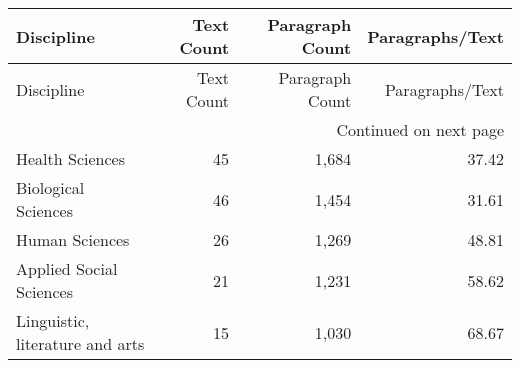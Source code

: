 \begin{longtable}{lrrr}
\toprule
Discipline & Text Count & Paragraph Count & Paragraphs/Text \\
\midrule
\endfirsthead
\toprule
Discipline & Text Count & Paragraph Count & Paragraphs/Text \\
\midrule
\endhead
\midrule
\multicolumn{4}{r}{Continued on next page} \\
\midrule
\endfoot
\bottomrule
\endlastfoot
Health Sciences & 45 & 1,684 & 37.42 \\
Biological Sciences & 46 & 1,454 & 31.61 \\
Human Sciences & 26 & 1,269 & 48.81 \\
Applied Social Sciences & 21 & 1,231 & 58.62 \\
Linguistic, literature and arts & 15 & 1,030 & 68.67 \\
\end{longtable}





